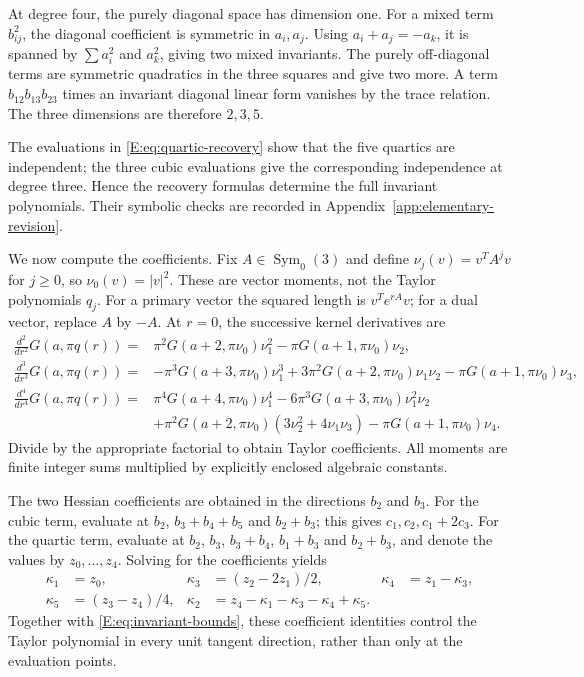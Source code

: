 \documentclass[reqno,english]{amsart}
\theoremstyle{definition}
\newtheorem{open problem}[theorem]{Open Problem}
\theoremstyle{remark}
\theoremstyle{plain}
\numberwithin{equation}{section}
\newcommand{\Symzero}{\operatorname{Sym}_0(3)}
\begin{document}
At degree four, the purely diagonal space has dimension one. For a
mixed term $b_{ij}^2$, the diagonal coefficient is symmetric in
$a_i,a_j$. Using $a_i+a_j=-a_k$, it is spanned by $\sum a_i^2$
and $a_k^2$, giving two mixed invariants. The purely off-diagonal
terms are symmetric quadratics in the three squares and give two
more. A term $b_{12}b_{13}b_{23}$ times an invariant diagonal linear
form vanishes by the trace relation. The three dimensions are
therefore $2,3,5$.

The evaluations in \eqref{E:eq:quartic-recovery} show that the five
quartics are independent; the three cubic evaluations give the
corresponding independence at degree three. Hence the recovery
formulas determine the full invariant polynomials. Their symbolic
checks are recorded in Appendix~\ref{app:elementary-revision}.


We now compute the coefficients. Fix $A\in\Symzero$ and define
$\nu_j(v)=v^TA^jv$ for $j\ge0$, so $\nu_0(v)=|v|^2$.
These are vector moments, not the Taylor polynomials $q_j$.
For a primary vector the squared length is $v^Te^{rA}v$; for a
dual vector, replace $A$ by $-A$. At $r=0$, the successive kernel
derivatives are
\begin{align}
 \frac{d^2}{dr^2}G(a,\pi q(r))={}&
 \pi^2G(a+2,\pi \nu_0)\nu_1^2-\pi G(a+1,\pi \nu_0)\nu_2,\\
 \frac{d^3}{dr^3}G(a,\pi q(r))={}&
 -\pi^3G(a+3,\pi \nu_0)\nu_1^3
 +3\pi^2G(a+2,\pi \nu_0)\nu_1\nu_2-\pi G(a+1,\pi \nu_0)\nu_3,\\
 \frac{d^4}{dr^4}G(a,\pi q(r))={}&
 \pi^4G(a+4,\pi \nu_0)\nu_1^4
 -6\pi^3G(a+3,\pi \nu_0)\nu_1^2\nu_2\nonumber\\
 &+\pi^2G(a+2,\pi \nu_0)(3\nu_2^2+4\nu_1\nu_3)
 -\pi G(a+1,\pi \nu_0)\nu_4.
 \label{E:eq:coefficient-derivatives}
\end{align}
Divide by the appropriate factorial to obtain Taylor coefficients. All moments are finite integer sums multiplied by explicitly enclosed algebraic constants.

The two Hessian coefficients are obtained in the directions $b_2$
and $b_3$. For the cubic term, evaluate at $b_2$,
$b_3+b_4+b_5$ and $b_2+b_3$; this gives
$c_1,c_2,c_1+2c_3$. For the quartic term, evaluate at $b_2$,
$b_3$, $b_3+b_4$, $b_1+b_3$ and $b_2+b_3$, and denote the
values by $z_0,\ldots,z_4$. Solving for the coefficients yields
\begin{align}
 \kappa_1&=z_0,&\kappa_3&=(z_2-2z_1)/2,&\kappa_4&=z_1-\kappa_3,\\
 \kappa_5&=(z_3-z_4)/4,&\kappa_2&=z_4-\kappa_1-\kappa_3-\kappa_4+\kappa_5.
 \label{E:eq:quartic-recovery}
\end{align}
Together with \eqref{E:eq:invariant-bounds}, these coefficient
identities control the Taylor polynomial in every unit tangent
direction, rather than only at the evaluation points.
\end{document}
